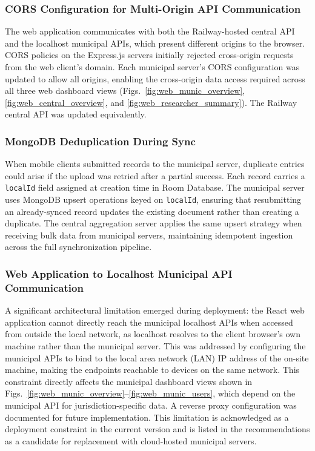 \documentclass[journal]{IEEEtran}
\begin{document}
\subsubsection{CORS Configuration for Multi-Origin API Communication}

The web application communicates with both the Railway-hosted central API and the
localhost municipal APIs, which present different origins to the browser. CORS policies
on the Express.js servers initially rejected cross-origin requests from the web client's
domain. Each municipal server's CORS configuration was updated to allow all origins,
enabling the cross-origin data access required across all three web dashboard views
(Figs.~\ref{fig:web_munic_overview}, \ref{fig:web_central_overview},
and \ref{fig:web_researcher_summary}). The Railway central API was updated
equivalently.

\subsubsection{MongoDB Deduplication During Sync}

When mobile clients submitted records to the municipal server, duplicate entries could
arise if the upload was retried after a partial success. Each record carries a
\texttt{localId} field assigned at creation time in Room Database. The municipal server
uses MongoDB upsert operations keyed on \texttt{localId}, ensuring that resubmitting an
already-synced record updates the existing document rather than creating a duplicate.
The central aggregation server applies the same upsert strategy when receiving bulk data
from municipal servers, maintaining idempotent ingestion across the full synchronization
pipeline.

\subsubsection{Web Application to Localhost Municipal API Communication}

A significant architectural limitation emerged during deployment: the React web
application cannot directly reach the municipal localhost APIs when accessed from outside
the local network, as localhost resolves to the client browser's own machine rather than
the municipal server. This was addressed by configuring the municipal APIs to bind to the
local area network (LAN) IP address of the on-site machine, making the endpoints
reachable to devices on the same network. This constraint directly affects the municipal
dashboard views shown in
Figs.~\ref{fig:web_munic_overview}--\ref{fig:web_munic_users}, which depend on
the municipal API for jurisdiction-specific data. A reverse proxy configuration was
documented for future implementation. This limitation is acknowledged as a deployment
constraint in the current version and is listed in the recommendations as a candidate for
replacement with cloud-hosted municipal servers.
\end{document}

